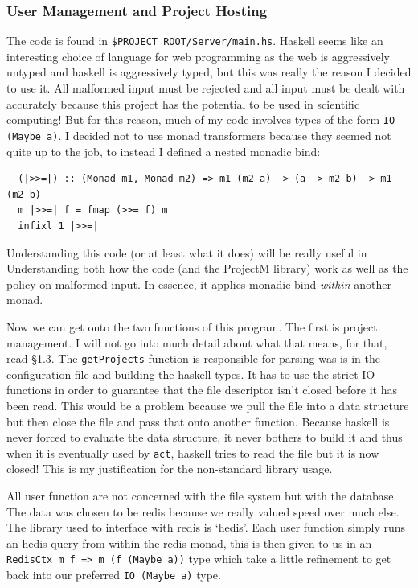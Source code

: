 \documentclass{article}
\begin{document}
\subsubsection{User Management and Project Hosting}
The code is found in \texttt{\$PROJECT\_ROOT/Server/main.hs}. Haskell seems like an interesting choice of language for web programming as
the web is aggressively untyped and haskell is aggressively typed, but this was really the reason I decided to use it. All malformed input
must be rejected and all input must be dealt with accurately because this project has the potential to be used in scientific computing!
But for this reason, much of my code involves types of the form \texttt{IO (Maybe a)}. I decided not to use monad transformers
because they seemed not quite up to the job, to instead I defined a nested monadic bind:
\begin{verbatim}
  (|>>=|) :: (Monad m1, Monad m2) => m1 (m2 a) -> (a -> m2 b) -> m1 (m2 b)
  m |>>=| f = fmap (>>= f) m
  infixl 1 |>>=|
\end{verbatim}
Understanding this code (or at least what it does) will be really useful in Understanding both how the code (and the ProjectM library) work as well as
the policy on malformed input. In essence, it applies monadic bind \textit{within} another monad.

Now we can get onto the two functions of this program. The first is project management. I will not go into much detail about what that means,
for that, read §1.3. The \texttt{getProjects} function is responsible for parsing was is in the configuration file and building
the haskell types. It has to use the strict IO functions in order to guarantee that the file descriptor isn't closed before it has been read.
This would be a problem because we pull the file into a data structure but then close the file and pass that onto another function. Because
haskell is never forced to evaluate the data structure, it never bothers to build it and thus when it is eventually used by \texttt{act},
haskell tries to read the file but it is now closed! This is my justification for the non-standard library usage.

All user function are not concerned with the file system but with the database. The data was chosen to be redis because we really 
valued speed over much else. The library used to interface with redis is `hedis'. Each user function simply runs an hedis query from within the
redis monad, this is then given to us in an \texttt{RedisCtx m f => m (f (Maybe a))} type which take a little refinement to get
back into our preferred \texttt{IO (Maybe a)} type.
\end{document}
